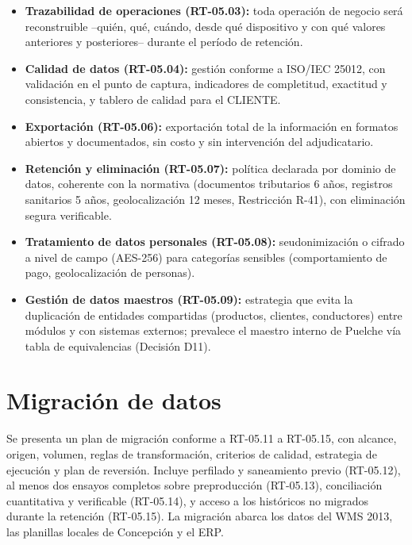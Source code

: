 \begin{itemize}
  \item \textbf{Trazabilidad de operaciones (RT-05.03):} toda operación de negocio será
        reconstruible --quién, qué, cuándo, desde qué dispositivo y con qué valores
        anteriores y posteriores-- durante el período de retención.
  \item \textbf{Calidad de datos (RT-05.04):} gestión conforme a ISO/IEC 25012, con
        validación en el punto de captura, indicadores de completitud, exactitud y
        consistencia, y tablero de calidad para el CLIENTE.
  \item \textbf{Exportación (RT-05.06):} exportación total de la información en formatos
        abiertos y documentados, sin costo y sin intervención del adjudicatario.
  \item \textbf{Retención y eliminación (RT-05.07):} política declarada por dominio de
        datos, coherente con la normativa (documentos tributarios 6 años, registros
        sanitarios 5 años, geolocalización 12 meses, Restricción R-41), con eliminación
        segura verificable.
  \item \textbf{Tratamiento de datos personales (RT-05.08):} seudonimización o cifrado a
        nivel de campo (AES-256) para categorías sensibles (comportamiento de pago,
        geolocalización de personas).
  \item \textbf{Gestión de datos maestros (RT-05.09):} estrategia que evita la duplicación
        de entidades compartidas (productos, clientes, conductores) entre módulos y con
        sistemas externos; prevalece el maestro interno de Puelche vía tabla de
        equivalencias (Decisión D11).
\end{itemize}

\section{Migración de datos}

Se presenta un plan de migración conforme a RT-05.11 a RT-05.15, con alcance, origen,
volumen, reglas de transformación, criterios de calidad, estrategia de ejecución y plan
de reversión. Incluye perfilado y saneamiento previo (RT-05.12), al menos dos ensayos
completos sobre preproducción (RT-05.13), conciliación cuantitativa y verificable
(RT-05.14), y acceso a los históricos no migrados durante la retención (RT-05.15). La
migración abarca los datos del WMS 2013, las planillas locales de Concepción y el ERP.


